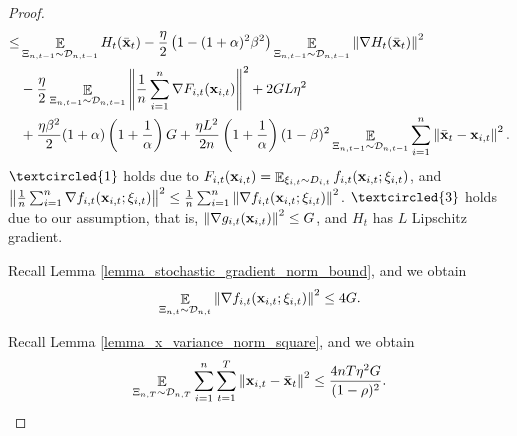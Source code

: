 \documentclass{article}
\begin{document}
\begin{proof}
\begin{align}
\le & \mathop{\mathbb{E}}_{ \Xi_{n,t-1} \sim \mathcal{D}_{n,t-1} } H_t(\bar{{\bf x}}_t) - \frac{\eta}{2} \left(  1-(1+\alpha)^2\beta^2  \right) \mathop{\mathbb{E}}_{ \Xi_{n,t-1} \sim \mathcal{D}_{n,t-1} }\left\lVert\nabla H_t(\bar{{\bf x}}_t)\right\rVert^2 \\ \nonumber 
& - \frac{\eta}{2}  \mathop{\mathbb{E}}_{ \Xi_{n,t-1} \sim \mathcal{D}_{n,t-1} }\left\lVert\frac{1}{n}\sum_{i=1}^n \nabla F_{i,t}({\bf x}_{i,t})\right\rVert^2  + 2GL\eta^2 \\ \nonumber
& + \frac{\eta \beta^2}{2} (1+\alpha) \left( 1+\frac{1}{\alpha} \right)  G  + \frac{\eta L^2}{2n} \left( 1+\frac{1}{\alpha} \right)(1-\beta)^2\mathop{\mathbb{E}}_{ \Xi_{n,t-1} \sim \mathcal{D}_{n,t-1} }\sum_{i=1}^n\left\lVert\bar{{\bf x}}_t - {\bf x}_{i,t}\right\rVert^2.
\end{align} $\textcircled{1}$ holds due to $F_{i,t}({\bf x}_{i,t}) = \mathop{\mathbb{E}}_{\xi_{i,t} \sim D_{i,t}} f_{i,t}({\bf x}_{i,t}; \xi_{i,t})$, and $\left\lVert\frac{1}{n}\sum_{i=1}^n \nabla f_{i,t}({\bf x}_{i,t};\xi_{i,t})\right\rVert^2 \le \frac{1}{n}\sum_{i=1}^n\left\lVert\nabla f_{i,t}({\bf x}_{i,t};\xi_{i,t})\right\rVert^2$.  $\textcircled{3}$ holds due to our assumption, that is, $\left\lVert\nabla g_{i,t}({\bf x}_{i,t})\right\rVert^2\le G$, and $H_t$ has $L$ Lipschitz gradient. 

Recall Lemma \ref{lemma_stochastic_gradient_norm_bound}, and we obtain
\begin{align}
\nonumber
\mathop{\mathbb{E}}_{ \Xi_{n,t} \sim \mathcal{D}_{n,t} }\left\lVert \nabla f_{i,t}({\bf x}_{i,t};\xi_{i,t})\right\rVert^2 \le 4G.
\end{align}

Recall Lemma \ref{lemma_x_variance_norm_square}, and we obtain
\begin{align}
\nonumber
\mathop{\mathbb{E}}_{ \Xi_{n,T} \sim \mathcal{D}_{n,T} } \sum_{i=1}^n\sum_{t=1}^T \left\lVert{\bf x}_{i,t} - \bar{{\bf x}}_t\right\rVert^2 \le \frac{4nT\eta^2 G }{(1-\rho)^2}.
\end{align}


\end{proof}
\end{document}
